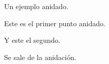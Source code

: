 \begin{functional}
	\item Un ejemplo anidado.
	\begin{functional}
		\item Este es el primer punto anidado.
		\item Y este el segundo.
	\end{functional}
	\item Se sale de la anidación.
\end{functional}
